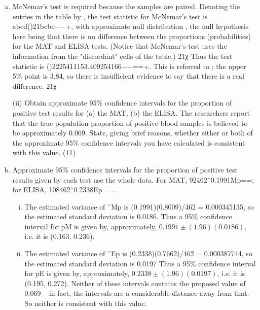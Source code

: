 \documentclass[a4paper,12pt]{article}
\begin{document}
\begin{enumerate}[(a)]
    \item McNemar's test is required because the samples are paired.
Denoting the entries in the table by , the test statistic for McNemar's test is abcd()21bcbc−−+, with approximate null distribution , the null hypothesis here being that there is no difference between the proportions (probabilities) for the MAT and ELISA tests. (Notice that McNemar's test uses the information from the "discordant" cells of the table.) 21χ
Thus the test statistic is ()2225411153.409254166−−==+. This is referred to ; the upper 5\% point is 3.84, so there is insufficient evidence to say that there is a real difference. 21χ
\newpage
\begin{framed}
(ii) Obtain approximate 95\% confidence intervals for the proportion of positive test results for 
 (a) the MAT, 
 (b) the ELISA. 
 The researchers report that the true population proportion of positive blood samples is believed to be approximately 0.069.  State, giving brief reasons, whether either or both of the approximate 95\% confidence intervals you have calculated is consistent with this value. (11) 
 \end{framed}

    \item  Approximate 95\% confidence intervals for the proportion of positive test results given by each test use the whole data. For MAT, 92462ˆ0.1991Mp==; for ELISA, 108462ˆ0.2338Ep==.
    
\begin{enumerate}[(i)]
    \item  The estimated variance of ˆMp is (0.1991)(0.8009)/462 = 0.000345135, so the estimated standard deviation is 0.0186. Thus a 95\% confidence interval for pM is given by, approximately, $0.1991 \pm (1.96)(0.0186)$, i.e. it is (0.163, 0.236).
\item The estimated variance of ˆEp is (0.2338)(0.7662)/462 = 0.000387744, so the estimated standard deviation is 0.0197 Thus a 95\% confidence interval for pE is given by, approximately, $0.2338 \pm (1.96)(0.0197)$, i.e. it is (0.195, 0.272).
Neither of these intervals contains the proposed value of 0.069 – in fact, the intervals are a considerable distance away from that. So neither is consistent with this value.
\end{enumerate}

\end{enumerate}
\end{document}
